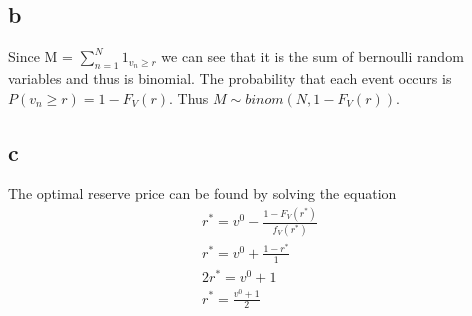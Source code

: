 \documentclass[10pt]{paper}
\begin{document}
\subsection*{b}

Since M = $\sum_{n=1}^N 1_{v_n \geq r}$ we can see that it is the
sum of bernoulli random variables and thus is binomial. The
probability that each event occurs is $P(v_n \geq r ) = 1 - F_V(r ).$
Thus $M \sim binom( N, 1- F_V(r) )$.

\subsection*{c}
The optimal reserve price can be found by solving the equation
\begin{align*}
  r^* = v^0 - \frac{1-F_V(r^*)}{f_V(r^*)}\\
  r^* =v^0 + \frac{1-r^*}{1}\\
  2r^* = v^0 + 1\\
  r^* = \frac{v^0 + 1}{2}\\
\end{align*}
\end{document}
